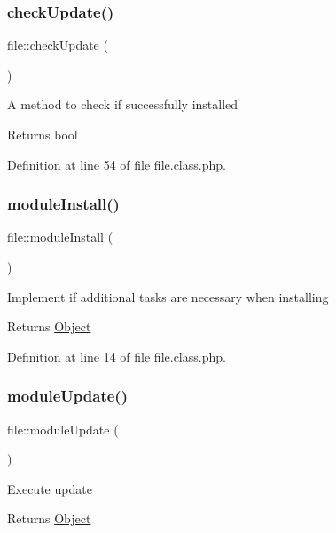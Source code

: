 \subsubsection{\texorpdfstring{check\+Update()}{checkUpdate()}}
{\footnotesize\ttfamily file\+::check\+Update (\begin{DoxyParamCaption}{ }\end{DoxyParamCaption})}

A method to check if successfully installed

\begin{DoxyReturn}{Returns}
bool 
\end{DoxyReturn}


Definition at line 54 of file file.\+class.\+php.

\mbox{\label{classfile_a5e8c34a5d2187f2a332a88e112c90bdc}} 
\subsubsection{\texorpdfstring{module\+Install()}{moduleInstall()}}
{\footnotesize\ttfamily file\+::module\+Install (\begin{DoxyParamCaption}{ }\end{DoxyParamCaption})}

Implement if additional tasks are necessary when installing

\begin{DoxyReturn}{Returns}
\hyperlink{classObject}{Object} 
\end{DoxyReturn}


Definition at line 14 of file file.\+class.\+php.

\mbox{\label{classfile_a13a5d2858426d421327f744555fec4fb}} 
\subsubsection{\texorpdfstring{module\+Update()}{moduleUpdate()}}
{\footnotesize\ttfamily file\+::module\+Update (\begin{DoxyParamCaption}{ }\end{DoxyParamCaption})}

Execute update

\begin{DoxyReturn}{Returns}
\hyperlink{classObject}{Object} 
\end{DoxyReturn}



